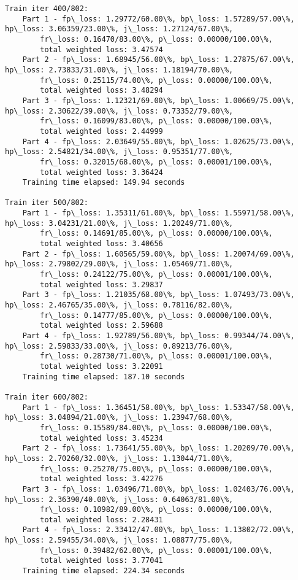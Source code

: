 \documentclass[11pt]{article}
\begin{document}
\begin{Verbatim}[commandchars=\\\{\}]
Train iter 400/802:
	Part 1 - fp\_loss: 1.29772/60.00\%, bp\_loss: 1.57289/57.00\%, hp\_loss: 3.06359/23.00\%, j\_loss: 1.27124/67.00\%, 
		fr\_loss: 0.16470/83.00\%, p\_loss: 0.00000/100.00\%, 
		total weighted loss: 3.47574
	Part 2 - fp\_loss: 1.68945/56.00\%, bp\_loss: 1.27875/67.00\%, hp\_loss: 2.73833/31.00\%, j\_loss: 1.18194/70.00\%, 
		fr\_loss: 0.25115/74.00\%, p\_loss: 0.00000/100.00\%, 
		total weighted loss: 3.48294
	Part 3 - fp\_loss: 1.12321/69.00\%, bp\_loss: 1.00669/75.00\%, hp\_loss: 2.30622/39.00\%, j\_loss: 0.73352/79.00\%, 
		fr\_loss: 0.16099/83.00\%, p\_loss: 0.00000/100.00\%, 
		total weighted loss: 2.44999
	Part 4 - fp\_loss: 2.03649/55.00\%, bp\_loss: 1.02625/73.00\%, hp\_loss: 2.54821/34.00\%, j\_loss: 0.95351/77.00\%, 
		fr\_loss: 0.32015/68.00\%, p\_loss: 0.00001/100.00\%, 
		total weighted loss: 3.36424
	Training time elapsed: 149.94 seconds

Train iter 500/802:
	Part 1 - fp\_loss: 1.35311/61.00\%, bp\_loss: 1.55971/58.00\%, hp\_loss: 3.04231/21.00\%, j\_loss: 1.20249/71.00\%, 
		fr\_loss: 0.14691/85.00\%, p\_loss: 0.00000/100.00\%, 
		total weighted loss: 3.40656
	Part 2 - fp\_loss: 1.60565/59.00\%, bp\_loss: 1.20074/69.00\%, hp\_loss: 2.79802/29.00\%, j\_loss: 1.05469/71.00\%, 
		fr\_loss: 0.24122/75.00\%, p\_loss: 0.00001/100.00\%, 
		total weighted loss: 3.29837
	Part 3 - fp\_loss: 1.21035/68.00\%, bp\_loss: 1.07493/73.00\%, hp\_loss: 2.46765/35.00\%, j\_loss: 0.78116/82.00\%, 
		fr\_loss: 0.14777/85.00\%, p\_loss: 0.00000/100.00\%, 
		total weighted loss: 2.59688
	Part 4 - fp\_loss: 1.92789/56.00\%, bp\_loss: 0.99344/74.00\%, hp\_loss: 2.59833/33.00\%, j\_loss: 0.89213/76.00\%, 
		fr\_loss: 0.28730/71.00\%, p\_loss: 0.00001/100.00\%, 
		total weighted loss: 3.22091
	Training time elapsed: 187.10 seconds

Train iter 600/802:
	Part 1 - fp\_loss: 1.36451/58.00\%, bp\_loss: 1.53347/58.00\%, hp\_loss: 3.04894/21.00\%, j\_loss: 1.23947/68.00\%, 
		fr\_loss: 0.15589/84.00\%, p\_loss: 0.00000/100.00\%, 
		total weighted loss: 3.45234
	Part 2 - fp\_loss: 1.73641/55.00\%, bp\_loss: 1.20209/70.00\%, hp\_loss: 2.70260/32.00\%, j\_loss: 1.13044/71.00\%, 
		fr\_loss: 0.25270/75.00\%, p\_loss: 0.00000/100.00\%, 
		total weighted loss: 3.42276
	Part 3 - fp\_loss: 1.03496/71.00\%, bp\_loss: 1.02403/76.00\%, hp\_loss: 2.36390/40.00\%, j\_loss: 0.64063/81.00\%, 
		fr\_loss: 0.10982/89.00\%, p\_loss: 0.00000/100.00\%, 
		total weighted loss: 2.28431
	Part 4 - fp\_loss: 2.33412/47.00\%, bp\_loss: 1.13802/72.00\%, hp\_loss: 2.59455/34.00\%, j\_loss: 1.08877/75.00\%, 
		fr\_loss: 0.39482/62.00\%, p\_loss: 0.00001/100.00\%, 
		total weighted loss: 3.77041
	Training time elapsed: 224.34 seconds


\end{Verbatim}
\end{document}
